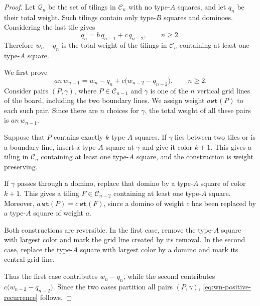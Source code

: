 \documentclass[10pt,a4paper]{amsart}
\newcommand{\wt}{{\texttt{wt}}}
\begin{document}
\begin{proof}
Let $\mathcal{Q}_n$ be the set of tilings in $\mathcal{C}_n$ with no type-$A$ squares, and let $q_n$ be their total weight. Such
tilings contain only type-$B$ squares and dominoes. Considering
the last tile gives
\begin{equation}\label{eq:gn-recurrence}
q_n=b\,q_{n-1}+c\,q_{n-2},
\qquad n\geq 2.
\end{equation}
Therefore $w_n-q_n$ is the total weight of the tilings in $\mathcal{C}_n$
containing at least one type-$A$ square. 

We first prove
\begin{equation}\label{eq:wn-positive-recurrence}
an\,w_{n-1}
=
w_n-q_n+c\bigl(w_{n-2}-q_{n-2}\bigr),
\qquad n\geq 2.
\end{equation}
Consider pairs $(P,\gamma)$, where $P\in\mathcal{C}_{n-1}$ and
$\gamma$ is one of the $n$ vertical grid lines of the board, including the two boundary lines. We assign weight $a\wt(P)$ to each such pair. Since there are $n$ choices for $\gamma$, the total weight of all
these pairs is $an\,w_{n-1}$.


Suppose that $P$ contains exactly $k$ type-$A$ squares. If $\gamma$ lies between two tiles or is a boundary line, insert a type-$A$ square
at $\gamma$ and give it color $k+1$.   This gives a tiling in $\mathcal{C}_n$ containing at least one type-$A$ square, and the
construction is weight preserving.

If $\gamma$ passes through a domino, replace that domino by a type-$A$
square of color $k+1$. This gives a tiling $F\in\mathcal{C}_{n-2}$
containing at least one type-$A$ square. Moreover, $a\,\wt(P)=c\,\wt(F)$, since a domino of weight $c$ has been replaced by a type-$A$ square
of weight $a$. 

Both constructions are reversible. In the first case, remove the
type-$A$ square with largest color and mark the grid line created by
its removal. In the second case, replace the type-$A$ square with
largest color by a domino and mark its central grid line.


Thus the first case contributes $w_n-q_n$, while the second contributes
$c\bigl(w_{n-2}-q_{n-2}\bigr)$. Since the two cases partition all
pairs $(P,\gamma)$, \eqref{eq:wn-positive-recurrence} follows.


\end{proof}
\end{document}
